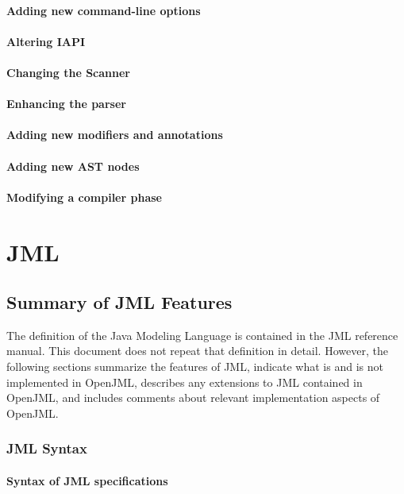 \documentclass{report}%
\begin{document}
\subsection{Adding new command-line options}
\subsection{Altering IAPI}
\subsection{Changing the Scanner}
\subsection{Enhancing the parser}
\subsection{Adding new modifiers and annotations}
\subsection{Adding new AST nodes}
\subsection{Modifying a compiler phase}



\part{JML}

\chapter{Summary of JML Features}

The definition of the Java Modeling Language is contained in the JML reference manual.\cite{TBD}
This document does not repeat that definition in detail. However, the following sections summarize the features of JML, indicate what is and is not implemented in OpenJML, describes any extensions to JML contained in OpenJML, and includes
comments about relevant implementation aspects of OpenJML.

\section{JML Syntax}

\subsection{Syntax of JML specifications}
\end{document}
